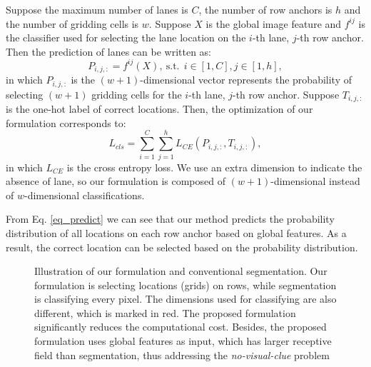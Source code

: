 \documentclass[runningheads]{llncs}
\begin{document}
Suppose the maximum number of lanes is $C$, the number of row anchors is $h$ and the number of gridding cells is $w$. Suppose $X$ is the global image feature and $f^{ij}$ is the classifier used for selecting the lane location on the $i$-th lane, $j$-th row anchor. Then the prediction of lanes can be written as:
\begin{equation}
	P_{i,j, :} = f^{ij}(X), \ \text{s.t.} \ \  i \in [1,C], j \in [1,h],
	\label{eq_predict}
\end{equation}
in which $P_{i,j,:}$ is the $(w+1)$-dimensional vector represents the probability of selecting $(w+1)$ gridding cells for the $i$-th lane, $j$-th row anchor. Suppose $T_{i,j,:}$ is the one-hot label of correct locations. Then, the optimization of our formulation corresponds to:
\begin{equation}
L_{cls}=\sum_{i=1}^{C} \sum_{j=1}^{h} L_{CE}(P_{i,j, :},T_{i,j, :}),
\end{equation}
in which $L_{CE}$ is the cross entropy loss. 
We use an extra dimension to indicate the absence of lane, so our formulation is composed of $(w+1)$-dimensional instead of $w$-dimensional classifications. 


From Eq. \ref{eq_predict} we can see that our method predicts the probability distribution of all locations on each row anchor based on global features. As a result, the correct location can be selected based on the probability distribution.

\begin{figure*}[t]
	\centering
	\caption{Illustration of our formulation and conventional segmentation. Our formulation is selecting locations (grids) on rows, while segmentation is classifying every pixel. The dimensions used for classifying are also different, which is marked in red. The proposed formulation significantly reduces the computational cost. Besides, the proposed formulation uses global features as input, which has larger receptive field than segmentation, thus addressing the \textit{no-visual-clue} problem}
	\label{fig_formulation_diff}
	\vspace{-10pt}
\end{figure*}
\end{document}
